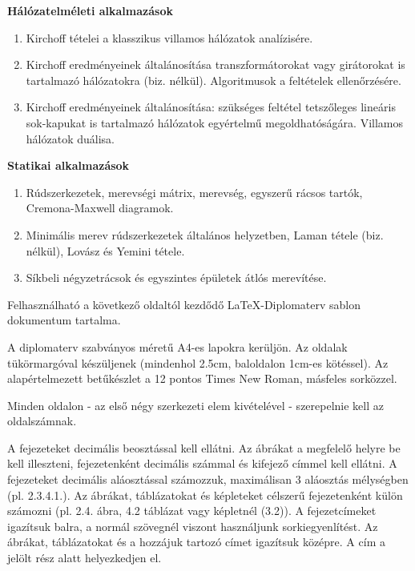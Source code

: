 \vspace{3mm}
\textbf{Hálózatelméleti alkalmazások}
\begin{enumerate}[resume]
\item	Kirchoff tételei a klasszikus villamos hálózatok analízisére.
\item	Kirchoff eredményeinek általánosítása transzformátorokat vagy girátorokat is tartalmazó hálózatokra (biz. nélkül). Algoritmusok a feltételek ellenőrzésére.
\item	Kirchoff eredményeinek általánosítása: szükséges feltétel tetszőleges lineáris sok-kapukat is tartalmazó hálózatok egyértelmű megoldhatóságára. Villamos hálózatok duálisa.
\end{enumerate}

\vspace{3mm}
\textbf{Statikai alkalmazások}
\begin{enumerate}[resume]
\item	Rúdszerkezetek, merevségi mátrix, merevség, egyszerű rácsos tartók, Cremona-Maxwell diagramok.
\item	Minimális merev rúdszerkezetek általános helyzetben, Laman tétele (biz. nélkül), Lovász és Yemini tétele.
\item	Síkbeli négyzetrácsok és egyszintes épületek átlós merevítése.

\end{enumerate}

\vspace{6mm}

Felhasználható a következő oldaltól kezdődő \LaTeX-Diplomaterv sablon dokumentum tartalma. 

A diplomaterv szabványos méretű A4-es lapokra kerüljön. Az oldalak tükörmargóval készüljenek (mindenhol 2.5cm, baloldalon 1cm-es kötéssel). Az alapértelmezett betűkészlet a 12 pontos Times New Roman, másfeles sorközzel.

Minden oldalon - az első négy szerkezeti elem kivételével - szerepelnie kell az oldalszámnak.

A fejezeteket decimális beosztással kell ellátni. Az ábrákat a megfelelő helyre be kell illeszteni, fejezetenként decimális számmal és kifejező címmel kell ellátni. A fejezeteket decimális aláosztással számozzuk, maximálisan 3 aláosztás mélységben (pl. 2.3.4.1.). Az ábrákat, táblázatokat és képleteket célszerű fejezetenként külön számozni (pl. 2.4. ábra, 4.2 táblázat vagy képletnél (3.2)). A fejezetcímeket igazítsuk balra, a normál szövegnél viszont használjunk sorkiegyenlítést. Az ábrákat, táblázatokat és a hozzájuk tartozó címet igazítsuk középre. A cím a jelölt rész alatt helyezkedjen el.

